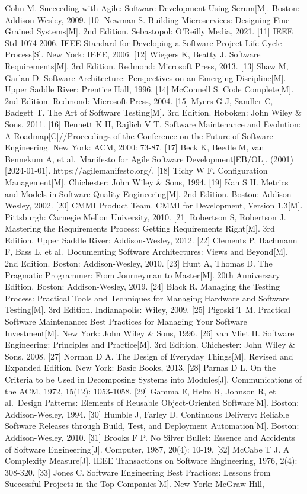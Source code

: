 Cohn M. Succeeding with Agile: Software Development Using Scrum{[}M{]}. Boston: Addison-Wesley, 2009. {[}10{]} Newman S. Building Microservices: Designing Fine-Grained Systems{[}M{]}. 2nd Edition. Sebastopol: O'Reilly Media, 2021. {[}11{]} IEEE Std 1074-2006. IEEE Standard for Developing a Software Project Life Cycle Process{[}S{]}. New York: IEEE, 2006. {[}12{]} Wiegers K, Beatty J. Software Requirements{[}M{]}. 3rd Edition. Redmond: Microsoft Press, 2013. {[}13{]} Shaw M, Garlan D. Software Architecture: Perspectives on an Emerging Discipline{[}M{]}. Upper Saddle River: Prentice Hall, 1996. {[}14{]} McConnell S. Code Complete{[}M{]}. 2nd Edition. Redmond: Microsoft Press, 2004. {[}15{]} Myers G J, Sandler C, Badgett T. The Art of Software Testing{[}M{]}. 3rd Edition. Hoboken: John Wiley \& Sons, 2011. {[}16{]} Bennett K H, Rajlich V T. Software Maintenance and Evolution: A Roadmap{[}C{]}//Proceedings of the Conference on the Future of Software Engineering. New York: ACM, 2000: 73-87. {[}17{]} Beck K, Beedle M, van Bennekum A, et al.~Manifesto for Agile Software Development{[}EB/OL{]}. (2001){[}2024-01-01{]}. https://agilemanifesto.org/. {[}18{]} Tichy W F. Configuration Management{[}M{]}. Chichester: John Wiley \& Sons, 1994. {[}19{]} Kan S H. Metrics and Models in Software Quality Engineering{[}M{]}. 2nd Edition. Boston: Addison-Wesley, 2002. {[}20{]} CMMI Product Team. CMMI for Development, Version 1.3{[}M{]}. Pittsburgh: Carnegie Mellon University, 2010. {[}21{]} Robertson S, Robertson J. Mastering the Requirements Process: Getting Requirements Right{[}M{]}. 3rd Edition. Upper Saddle River: Addison-Wesley, 2012. {[}22{]} Clements P, Bachmann F, Bass L, et al.~Documenting Software Architectures: Views and Beyond{[}M{]}. 2nd Edition. Boston: Addison-Wesley, 2010. {[}23{]} Hunt A, Thomas D. The Pragmatic Programmer: From Journeyman to Master{[}M{]}. 20th Anniversary Edition. Boston: Addison-Wesley, 2019. {[}24{]} Black R. Managing the Testing Process: Practical Tools and Techniques for Managing Hardware and Software Testing{[}M{]}. 3rd Edition. Indianapolis: Wiley, 2009. {[}25{]} Pigoski T M. Practical Software Maintenance: Best Practices for Managing Your Software Investment{[}M{]}. New York: John Wiley \& Sons, 1996. {[}26{]} van Vliet H. Software Engineering: Principles and Practice{[}M{]}. 3rd Edition. Chichester: John Wiley \& Sons, 2008. {[}27{]} Norman D A. The Design of Everyday Things{[}M{]}. Revised and Expanded Edition. New York: Basic Books, 2013. {[}28{]} Parnas D L. On the Criteria to be Used in Decomposing Systems into Modules{[}J{]}. Communications of the ACM, 1972, 15(12): 1053-1058. {[}29{]} Gamma E, Helm R, Johnson R, et al.~Design Patterns: Elements of Reusable Object-Oriented Software{[}M{]}. Boston: Addison-Wesley, 1994. {[}30{]} Humble J, Farley D. Continuous Delivery: Reliable Software Releases through Build, Test, and Deployment Automation{[}M{]}. Boston: Addison-Wesley, 2010. {[}31{]} Brooks F P. No Silver Bullet: Essence and Accidents of Software Engineering{[}J{]}. Computer, 1987, 20(4): 10-19. {[}32{]} McCabe T J. A Complexity Measure{[}J{]}. IEEE Transactions on Software Engineering, 1976, 2(4): 308-320. {[}33{]} Jones C. Software Engineering Best Practices: Lessons from Successful Projects in the Top Companies{[}M{]}. New York: McGraw-Hill, 